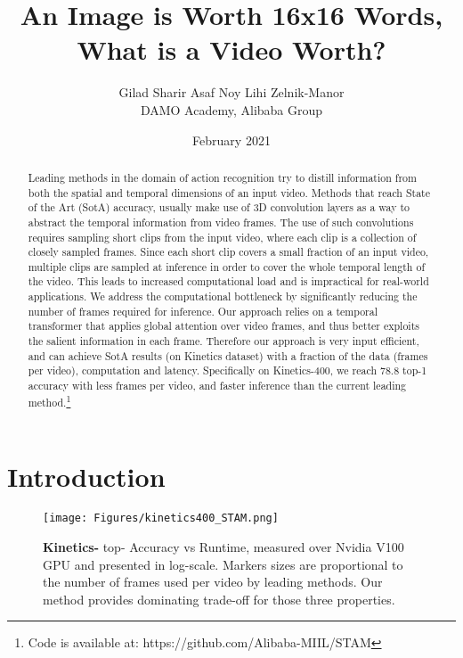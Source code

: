 \documentclass[10pt,twocolumn,letterpaper]{article}
\title{An Image is Worth 16x16 Words, What is a Video Worth?}
\author{Gilad Sharir \hspace{0.1cm} Asaf Noy \hspace{0.1cm} Lihi Zelnik-Manor \\
DAMO Academy, Alibaba Group
}
\date{February 2021}
\begin{document}
\maketitle

\begin{abstract}
\noindent Leading methods in the domain of action recognition try to distill information from both the spatial and temporal dimensions of an input video. Methods that reach State of the Art (SotA) accuracy, usually make use of 3D convolution layers as a way to abstract the temporal information from video frames. The use of such convolutions requires sampling short clips from the input video, where each clip is a collection of closely sampled frames. 
Since each short clip covers a small fraction of an input video, multiple clips are sampled at inference in order to cover the whole temporal length of the video. This leads to increased computational load and is impractical for real-world applications. We address the computational bottleneck by significantly reducing the number of frames required for inference.
Our approach relies on a temporal transformer that applies global attention over video frames, and thus better exploits the salient information in each frame.  
Therefore our approach is very input efficient, and can achieve SotA results (on Kinetics dataset) with a fraction of the data (frames per video), computation and latency. Specifically on Kinetics-400, we reach 78.8 top-1 accuracy with  less frames per video, and  faster inference than the current leading method.\footnote{Code is available at: https://github.com/Alibaba-MIIL/STAM}

\end{abstract}
 
\section{Introduction}
\begin{figure} [t]
  \centering
  \texttt{[image: Figures/kinetics400\_STAM.png]}
  \caption{{\textbf{Kinetics-} top- Accuracy vs Runtime, measured over Nvidia V100 GPU and presented in log-scale. Markers sizes are proportional to the number of frames used per video by leading methods.
  Our method provides dominating trade-off for those three properties.}}
  \label{fig:runtime_accuracy}
\end{figure} 
\end{document}
